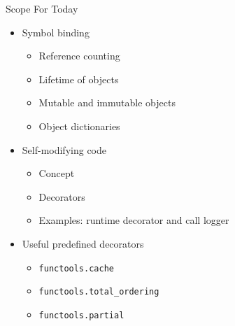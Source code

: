 \begin{frame}{Scope For Today}
%
\begin{itemize}
\item Symbol binding
	\begin{itemize}
	\item Reference counting
	\item Lifetime of objects
	\item Mutable and immutable objects
	\item Object dictionaries
	\end{itemize}
\item Self-modifying code
	\begin{itemize}
	\item Concept
	\item Decorators
	\item Examples: runtime decorator and call logger
	\end{itemize}
\item Useful predefined decorators
	\begin{itemize}
	\item \texttt{functools.cache}
	\item \texttt{functools.total\_ordering}
	\item \texttt{functools.partial}
	\end{itemize}
\end{itemize}
%
\end{frame}


